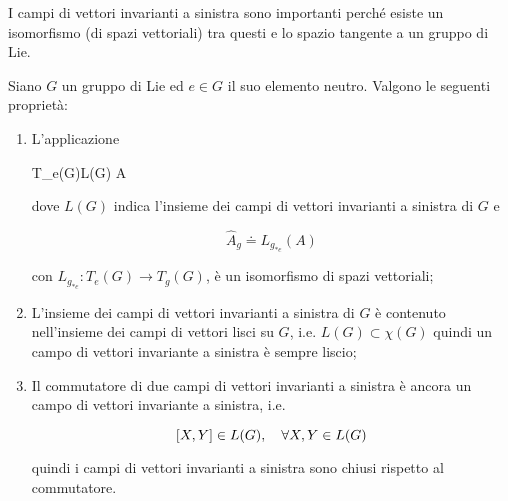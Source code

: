 I campi di vettori invarianti a sinistra sono importanti perché esiste un isomorfismo (di spazi vettoriali) tra questi e lo spazio tangente a un gruppo di Lie.

\begin{theorem}
	Siano $ G $ un gruppo di Lie ed $ e \in G $ il suo elemento neutro. Valgono le seguenti proprietà:
	
	\begin{enumerate}
		\item L'applicazione
		
		\map{\hat{}}%
			{T_{e}(G)}{L(G)}%
			{A}{}
			
		dove $ L(G) $ indica l'insieme dei campi di vettori invarianti a sinistra di $ G $ e
		
		\begin{equation}
			\hat{A}_{g} \doteq L_{g_{*e}}(A)
		\end{equation}
	
		con $ L_{g_{*e}} : T_{e}(G) \to T_{g}(G) $, è un isomorfismo di spazi vettoriali;
		
		\item L'insieme dei campi di vettori invarianti a sinistra di $ G $ è contenuto nell'insieme dei campi di vettori lisci su $ G $, i.e. $ L(G) \subset \chi(G) $ quindi un campo di vettori invariante a sinistra è sempre liscio;
		
		\item Il commutatore di due campi di vettori invarianti a sinistra è ancora un campo di vettori invariante a sinistra, i.e.
		
		\begin{equation}
			\comm{X}{Y} \in L(G) \qcomma \forall X,Y \in L(G)
		\end{equation}
	
		quindi i campi di vettori invarianti a sinistra sono chiusi rispetto al commutatore.
	\end{enumerate}
\end{theorem}

